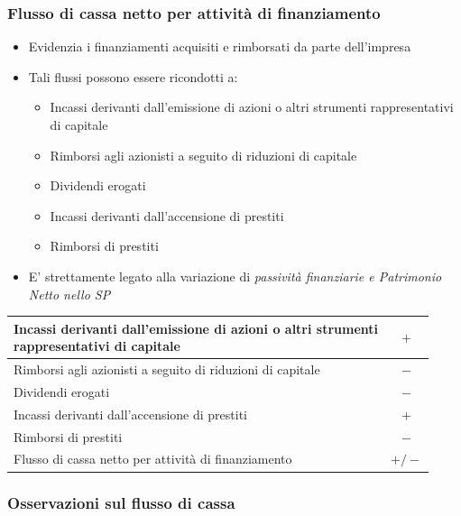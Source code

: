 \documentclass[10pt,a4paper,fleqn,oneside]{book}
\newcommand{\grayrow}{\rowcolor[gray]{.90}}
\begin{document}
\subsubsection{Flusso di cassa netto per attività di finanziamento}
\begin{itemize}
    \item Evidenzia i finanziamenti acquisiti e rimborsati da parte dell’impresa
    \item Tali flussi possono essere ricondotti a:
    \begin{itemize}
        \item Incassi derivanti dall’emissione di azioni o altri strumenti rappresentativi
        di capitale
        \item Rimborsi agli azionisti a seguito di riduzioni di capitale
        \item Dividendi erogati
        \item Incassi derivanti dall’accensione di prestiti
        \item Rimborsi di prestiti
    \end{itemize}
    
    \item E’ strettamente legato alla variazione di \emph{passività finanziarie e Patrimonio
    Netto nello SP}
\end{itemize}

\begin{tabular}{|l|c|}
    \hline
    \makecell[l]{Incassi derivanti dall’emissione di azioni o altri strumenti\\
    rappresentativi di capitale} & $+$ \\
    \hline
    Rimborsi agli azionisti a seguito di riduzioni di capitale & $-$ \\
    \hline
    Dividendi erogati & $-$ \\
    \hline
    Incassi derivanti dall’accensione di prestiti & $+$ \\
    \hline
    Rimborsi di prestiti & $-$ \\
    \hline\grayrow
    Flusso di cassa netto per attività di finanziamento & $+/-$ \\
    \hline
\end{tabular}

\subsubsection{Osservazioni sul flusso di cassa}
\end{document}
